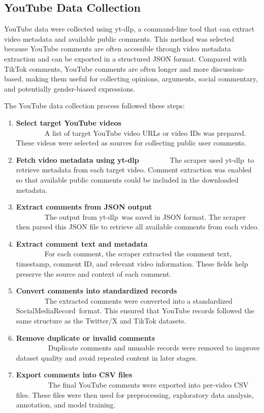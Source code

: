 \documentclass[12pt,oneside,openright,a4paper]{cpe-english-project}
\begin{document}
\subsection{YouTube Data Collection}

YouTube data were collected using yt-dlp, a command-line tool that can extract video metadata and available public comments. This method was selected because YouTube comments are often accessible through video metadata extraction and can be exported in a structured JSON format. Compared with TikTok comments, YouTube comments are often longer and more discussion-based, making them useful for collecting opinions, arguments, social commentary, and potentially gender-biased expressions.

The YouTube data collection process followed these steps:

\begin{enumerate}
\item
  {\textbf{Select target YouTube videos}\\
  ~~~~~~~~A list of target YouTube video URLs or video IDs was prepared. These videos were selected as sources for collecting public user comments.}
\item
  {\textbf{Fetch video metadata using yt-dlp}\hfill\break
  ~~~~~~~~The scraper used yt-dlp~to retrieve metadata from each target video. Comment extraction was enabled so that available public comments could be included in the downloaded metadata.}
\item
  {\textbf{Extract comments from JSON output}\\
  ~~~~~~~~The output from yt-dlp~was saved in JSON format. The scraper then parsed this JSON file to retrieve all available comments from each video.}
\item
  {\textbf{Extract comment text and metadata}\\
  ~~~~~~~~For each comment, the scraper extracted the comment text, timestamp, comment ID, and relevant video information. These fields help preserve the source and context of each comment.}
\item
  {\textbf{Convert comments into standardized records}\\
  ~~~~~~~~The extracted comments were converted into a standardized SocialMediaRecord~format. This ensured that YouTube records followed the same structure as the Twitter/X and TikTok datasets.}
\item
  {\textbf{Remove duplicate or invalid comments}\\
  ~~~~~~~~~Duplicate comments and unusable records were removed to improve dataset quality and avoid repeated content in later stages.}
\item
  {\textbf{Export comments into CSV files}\\
  ~~~~~~~~~The final YouTube comments were exported into per-video CSV files. These files were then used for preprocessing, exploratory data analysis, annotation, and model training.}
\end{enumerate}
\end{document}
